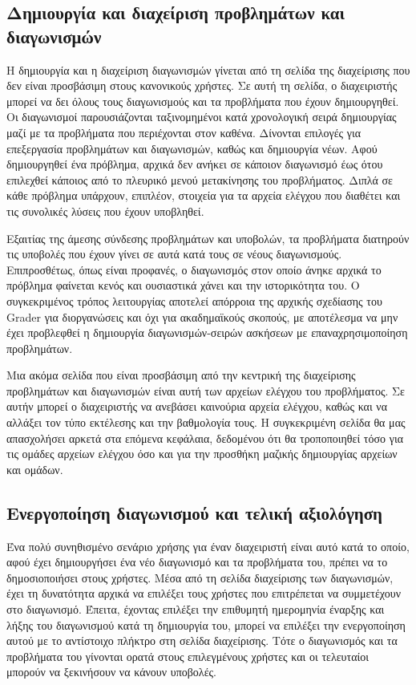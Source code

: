 \documentclass[diploma]{softlab-thesis}
\begin{document}
\subsection{Δημιουργία και διαχείριση προβλημάτων και διαγωνισμών}

Η δημιουργία και η διαχείριση διαγωνισμών γίνεται από τη σελίδα της διαχείρισης
που δεν είναι προσβάσιμη στους κανονικούς χρήστες. Σε αυτή τη σελίδα, ο
διαχειριστής μπορεί να δει όλους τους διαγωνισμούς και τα προβλήματα που έχουν
δημιουργηθεί. Οι διαγωνισμοί παρουσιάζονται ταξινομημένοι κατά χρονολογική
σειρά δημιουργίας μαζί με τα προβλήματα που περιέχονται στον καθένα. Δίνονται
επιλογές για επεξεργασία προβλημάτων και διαγωνισμών, καθώς και δημιουργία
νέων. Αφού δημιουργηθεί ένα πρόβλημα, αρχικά δεν ανήκει σε κάποιον διαγωνισμό
έως ότου επιλεχθεί κάποιος από το πλευρικό μενού μετακίνησης του προβλήματος.
Διπλά σε κάθε πρόβλημα υπάρχουν, επιπλέον, στοιχεία για τα αρχεία ελέγχου που
διαθέτει και τις συνολικές λύσεις που έχουν υποβληθεί.

\bigskip

Εξαιτίας της άμεσης σύνδεσης προβλημάτων και υποβολών, τα προβλήματα διατηρούν
τις υποβολές που έχουν γίνει σε αυτά κατά τους σε νέους διαγωνισμούς.
Επιπροσθέτως, όπως είναι προφανές, ο διαγωνισμός στον οποίο άνηκε αρχικά το
πρόβλημα φαίνεται κενός και ουσιαστικά χάνει και την ιστορικότητα του. Ο
συγκεκριμένος τρόπος λειτουργίας αποτελεί απόρροια της αρχικής σχεδίασης του
Grader για διοργανώσεις και όχι για ακαδημαϊκούς σκοπούς, με αποτέλεσμα να μην
έχει προβλεφθεί η δημιουργία διαγωνισμών-σειρών ασκήσεων με επαναχρησιμοποίηση
προβλημάτων.

\bigskip

Μια ακόμα σελίδα που είναι προσβάσιμη από την κεντρική της διαχείρισης προβλημάτων
και διαγωνισμών είναι αυτή των αρχείων ελέγχου του προβλήματος. Σε αυτήν μπορεί
ο διαχειριστής να ανεβάσει καινούρια αρχεία ελέγχου, καθώς και να αλλάξει τον τύπο
εκτέλεσης και την βαθμολογία τους. Η συγκεκριμένη σελίδα θα μας απασχολήσει αρκετά
στα επόμενα κεφάλαια, δεδομένου ότι θα τροποποιηθεί τόσο για τις ομάδες αρχείων
ελέγχου όσο και για την προσθήκη μαζικής δημιουργίας αρχείων και ομάδων.

\subsection{Ενεργοποίηση διαγωνισμού και τελική αξιολόγηση}

Ένα πολύ συνηθισμένο σενάριο χρήσης για έναν διαχειριστή είναι αυτό κατά το
οποίο, αφού έχει δημιουργήσει ένα νέο διαγωνισμό και τα προβλήματα του, πρέπει
να το δημοσιοποιήσει στους χρήστες. Μέσα από τη σελίδα διαχείρισης των
διαγωνισμών, έχει τη δυνατότητα αρχικά να επιλέξει τους χρήστες που επιτρέπεται
να συμμετέχουν στο διαγωνισμό. Έπειτα, έχοντας επιλέξει την επιθυμητή
ημερομηνία έναρξης και λήξης του διαγωνισμού κατά τη δημιουργία του, μπορεί να
επιλέξει την ενεργοποίηση αυτού με το αντίστοιχο πλήκτρο στη σελίδα
διαχείρισης. Τότε ο διαγωνισμός και τα προβλήματα του γίνονται ορατά στους
επιλεγμένους χρήστες και οι τελευταίοι μπορούν να ξεκινήσουν να κάνουν
υποβολές.
\end{document}
